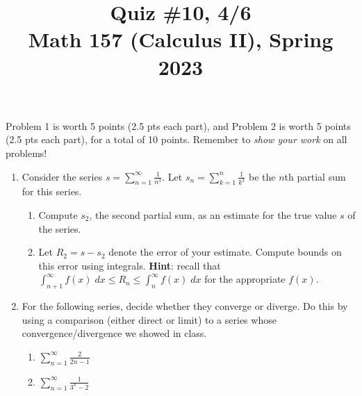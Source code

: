 \documentclass[11pt]{article}
\title{Quiz \#10, 4/6\\ Math 157 (Calculus II), Spring 2023}
\date{}
\begin{document}
\maketitle

\thispagestyle{empty}

\vspace{-2cm}

Problem 1 is worth 5 points (2.5 pts each part), and Problem 2 is worth 5 points (2.5 pts each part), for a total of 10 points. Remember to \emph{show your work} on all problems!

\begin{enumerate}

\item Consider the series $s = \displaystyle \sum_{n=1}^{\infty}\frac{1}{n^3}$. Let $s_n = \displaystyle \sum_{k=1}^{n} \frac{1}{k^3}$ be the $n$th partial sum for this series.

\begin{enumerate}
\item Compute $s_2$, the second partial sum, as an estimate for the true value $s$ of the series.
\item Let $R_2 = s - s_2$ denote the error of your estimate. Compute bounds on this error using integrals. {\bf Hint}: recall that $\int_{n+1}^{\infty} f(x) \; dx \leq R_n \leq \int_{n}^{\infty} f(x) \; dx$ for the appropriate $f(x)$.
\end{enumerate}

\vspace{2.5in}

\item For the following series, decide whether they converge or diverge. Do this by using a comparison (either direct or limit) to a series whose convergence/divergence we showed in class.

\begin{enumerate}
\item $\displaystyle \sum_{n=1}^{\infty} \frac{2}{2n-1}$
\item $\displaystyle \sum_{n=1}^{\infty} \frac{1}{3^n - 2}$
\end{enumerate}

\end{enumerate}
\end{document}
